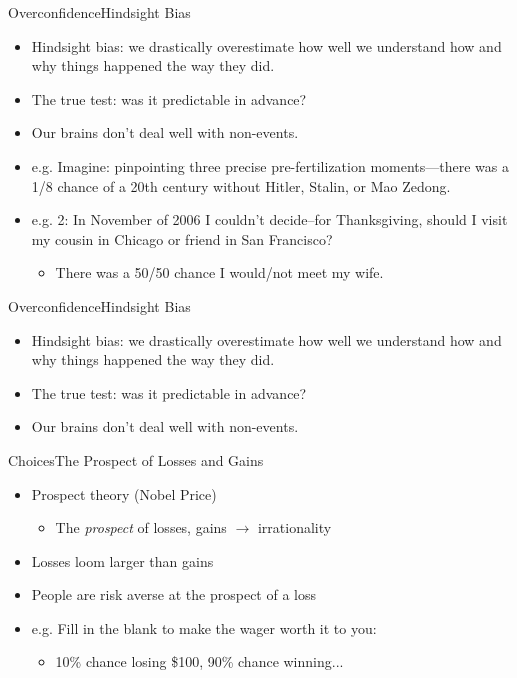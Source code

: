 \documentclass{beamer}
\begin{document}
\begin{frame}{Overconfidence}{Hindsight Bias}
\begin{itemize}
\addtolength{\itemsep}{0.5\baselineskip}
\item Hindsight bias: we drastically overestimate how well we understand how and why things happened the way they did. 
\item The true test: was it predictable in advance?
\item Our brains don't deal well with non-events.
\item e.g. Imagine: pinpointing three precise pre-fertilization moments---there was a 1/8 chance of a 20th century without Hitler, Stalin, or Mao Zedong. 
\item e.g. 2: In November of 2006 I couldn't decide--for Thanksgiving, should I visit my cousin in Chicago or friend in San Francisco?
  \begin{itemize}
  \item There was a 50/50 chance I would/not meet my wife.
  \end{itemize}
\end{itemize}
\end{frame}

\begin{frame}{Overconfidence}{Hindsight Bias}
\begin{itemize}
\addtolength{\itemsep}{0.5\baselineskip}
\item Hindsight bias: we drastically overestimate how well we understand how and why things happened the way they did. 
\item The true test: was it predictable in advance?
\item Our brains don't deal well with non-events.
\end{itemize}
\end{frame}

\begin{frame}{Choices}{The Prospect of Losses and Gains}
  \begin{itemize}
  \addtolength{\itemsep}{0.5\baselineskip}
  \item Prospect theory (Nobel Price) 
        \begin{itemize}
        \item The {\it prospect} of losses, gains $\rightarrow$ irrationality
        \end{itemize}
  \item Losses loom larger than gains
  \item People are risk averse at the prospect of a loss
  \item e.g. Fill in the blank to make the wager worth it to you:
        \begin{itemize}
        \item 10\% chance losing \$100, 90\% chance winning...
        \end{itemize}
  \end{itemize}
\end{frame}
\end{document}
